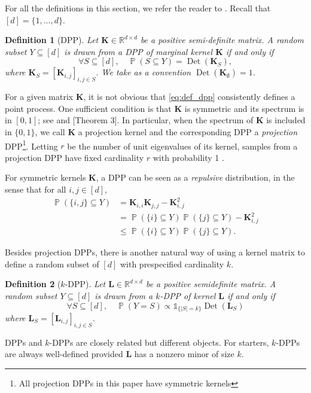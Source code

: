 \documentclass[twoside,11pt]{book}
\newtheorem{definition}{Definition}
\numberwithin{theorem}{chapter}
\numberwithin{definition}{chapter}
\numberwithin{proposition}{chapter}
\numberwithin{corollary}{chapter}
\numberwithin{example}{chapter}
\numberwithin{lemma}{chapter}
\DeclareMathOperator{\Det}{Det}
\DeclareMathOperator{\Prb}{\mathbb{P}}
\begin{document}
For all the definitions in this section, we refer the reader to \citep{KuTa12}. Recall that $[d] = \{1,\dots,d\}$.%
\begin{definition}[DPP]
Let $\bm{K} \in \mathbb{R}^{d\times d}$ be a positive semi-definite matrix.
A random subset $Y \subseteq [d]$ is drawn from a DPP of marginal kernel $\bm{K}$ if and only if
\begin{equation}\label{eq:def_dpp}
\forall S \subseteq [d],\quad \Prb(S \subseteq Y) = \Det(\bm{K}_{S}),
\end{equation}
where $\bm{K}_{S} = [\bm{K}_{i,j}]_{i,j \in S}$. We take as a convention $\Det(\bm{K}_{\emptyset}) = 1$.
\end{definition}
For a given matrix $\bm{K}$, it is not obvious that \eqref{eq:def_dpp} consistently defines a point process. One sufficient condition is that $\bm{K}$ is symmetric and its spectrum is in $[0,1]$; see \citep{Mac75} and \citep{Sos00}[Theorem 3]. In particular, when the spectrum of $\bm{K}$ is included in $\{0,1\}$, we call $\bm{K}$ a projection kernel and the corresponding DPP a \emph{projection} DPP\footnote{All projection DPPs in this paper have symmetric kernels}. Letting $r$ be the number of unit eigenvalues of its kernel, samples from a projection DPP have fixed cardinality $r$ with probability 1 \cite*[Lemma 17]{HoKrPeVi06}.

For symmetric kernels $\bm{K}$, a DPP can be seen as a \emph{repulsive} distribution, in the sense that for all $i,j\in [d]$,
\begin{align}
  \Prb(\{i,j\} \subseteq Y) &= \bm{K}_{i,i} \bm{K}_{j,j} - \bm{K}^2_{i,j}\\
  &= \Prb(\{i\} \subseteq Y)\Prb(\{j\} \subseteq Y) - \bm{K}^2_{i,j}\\
  &\leq \Prb(\{i\} \subseteq Y)\Prb(\{j\} \subseteq Y).
\end{align}

Besides projection DPPs, there is another natural way of using a kernel matrix to define a random subset of $[d]$ with prespecified cardinality $k$.
\begin{definition}[$k$-DPP]\label{def:kDPP}
Let $\bm{L} \in \mathbb{R}^{d\times d}$ be a positive semidefinite matrix.
A random subset $Y \subseteq [d]$ is drawn from a $k$-DPP of kernel $\bm{L}$ if and only if
\begin{equation}\label{eq:def_kdpp}
\forall S \subseteq [d],\quad \Prb(Y = S) \propto \mathbb{1}_{\{\vert S\vert = k\}}\Det(\bm{L}_{S})
\end{equation}
where $\bm{L}_{S} = [\bm{L}_{i,j}]_{i,j \in S}$.
\end{definition}
DPPs and $k$-DPPs are closely related but different objects. For starters, $k$-DPPs are always well-defined provided $\bm{L}$ has a nonzero minor of size $k$.
\end{document}
